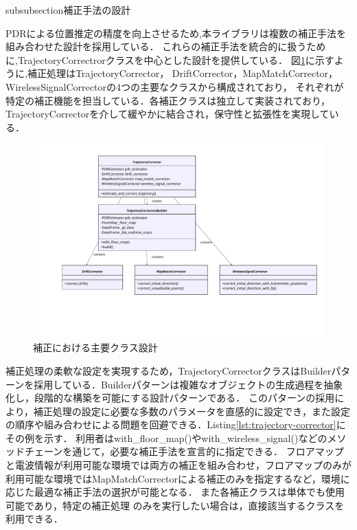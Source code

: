 
subsubsection{補正手法の設計}


PDRによる位置推定の精度を向上させるため,本ライブラリは複数の補正手法を
組み合わせた設計を採用している．
これらの補正手法を統合的に扱うために,TrajectoryCorrectrorクラスを中心とした設計を提供している．
図\ref{fig:corrector-class}に示すように,補正処理はTrajectoryCorrector，
DriftCorrector，MapMatchCorrector，WirelessSignalCorrectorの4つの主要なクラスから構成されており，
それぞれが特定の補正機能を担当している．各補正クラスは独立して実装されており，
TrajectoryCorrectorを介して緩やかに結合され，保守性と拡張性を実現している．

\begin{figure}[H]
    \centering
    \includegraphics[width=\linewidth]{../image/trajectory_corrector.pdf}
    \caption{補正における主要クラス設計}
    \label{fig:corrector-class}
\end{figure}

補正処理の柔軟な設定を実現するため，TrajectoryCorrectorクラスはBuilderパターンを採用している．Builderパターンは複雑なオブジェクトの生成過程を抽象化し，段階的な構築を可能にする設計パターンである．
このパターンの採用により，補正処理の設定に必要な多数のパラメータを直感的に設定でき，また設定の順序や組み合わせによる問題を回避できる．Listing\ref{lst:trajectory-corrector}にその例を示す．
利用者はwith\_floor\_map()やwith\_wireless\_signal()などのメソッドチェーンを通じて，必要な補正手法を宣言的に指定できる． フロアマップと電波情報が利用可能な環境では両方の補正を組み合わせ，フロアマップのみが利用可能な環境ではMapMatchCorrectorによる補正のみを指定するなど，環境に応じた最適な補正手法の選択が可能となる．
また各補正クラスは単体でも使用可能であり，特定の補正処理
のみを実行したい場合は，直接該当するクラスを利用できる．

